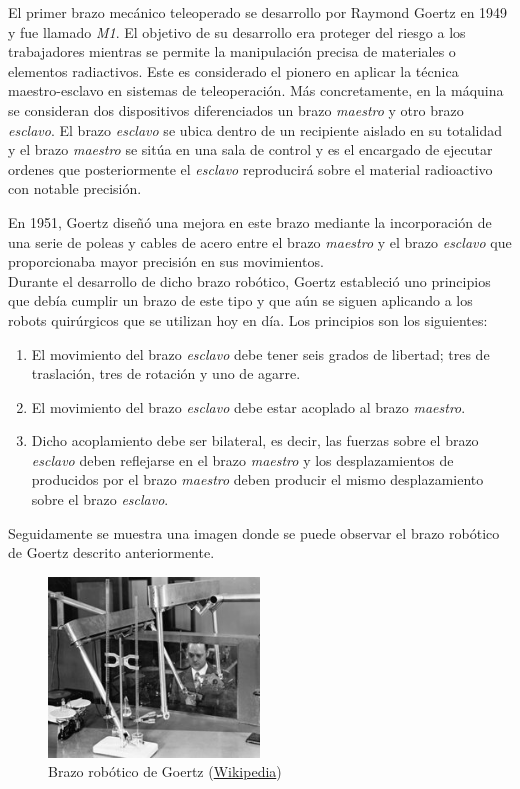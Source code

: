El primer brazo mecánico teleoperado se desarrollo por Raymond Goertz en 1949 y fue llamado \textit{M1}. El objetivo de su desarrollo era proteger del riesgo a los trabajadores mientras se permite la manipulación precisa de materiales o elementos radiactivos. Este es considerado el pionero en aplicar la técnica maestro-esclavo en sistemas de teleoperación. Más concretamente, en la máquina se consideran dos dispositivos diferenciados un brazo \textit{maestro} y otro brazo \textit{esclavo}. El brazo \textit{esclavo} se ubica dentro de un recipiente aislado en su totalidad y el brazo \textit{maestro} se sitúa en una sala de control y es el encargado de ejecutar ordenes que posteriormente el \textit{esclavo} reproducirá sobre el material radioactivo con notable precisión.

En 1951, Goertz diseñó una mejora en este brazo mediante la incorporación de una serie de poleas y cables de acero entre el brazo \textit{maestro} y el brazo \textit{esclavo} que proporcionaba mayor precisión en sus movimientos.\\

Durante el desarrollo de dicho brazo robótico, Goertz estableció uno principios que debía cumplir un brazo de este tipo y que aún se siguen aplicando a los robots quirúrgicos que se utilizan hoy en día. Los principios son los siguientes:

\begin{enumerate}
\item El movimiento del brazo \textit{esclavo} debe tener seis grados de libertad; tres de traslación, tres de rotación y uno de agarre.

\item El movimiento del brazo \textit{esclavo} debe estar acoplado al brazo \textit{maestro}.

\item Dicho acoplamiento debe ser bilateral, es decir, las fuerzas sobre el brazo \textit{esclavo} deben reflejarse en el brazo \textit{maestro} y los desplazamientos de producidos por el brazo \textit{maestro} deben producir el mismo desplazamiento sobre el brazo \textit{esclavo}.

\end{enumerate}


Seguidamente se muestra una imagen donde se puede observar el brazo robótico de Goertz descrito anteriormente.



\begin{figure}[H]
\begin{center}
  \includegraphics[width=0.5\textwidth]{./EtapaPrimeriza/imagenes/brazo.jpg}
  \caption{Brazo robótico de Goertz (\href{https://en.wikipedia.org/wiki/Raymond\_Goertz\#/media/File:Apf1-06395t.jpg} {Wikipedia})}
  \label{brazo}
\end{center}
\end{figure}
